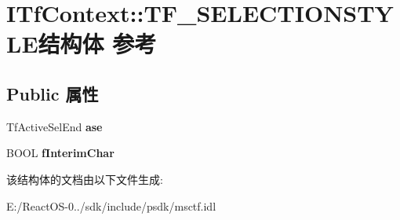 \hypertarget{struct_i_tf_context_1_1_t_f___s_e_l_e_c_t_i_o_n_s_t_y_l_e}{}\section{I\+Tf\+Context\+:\+:T\+F\+\_\+\+S\+E\+L\+E\+C\+T\+I\+O\+N\+S\+T\+Y\+L\+E结构体 参考}
\label{struct_i_tf_context_1_1_t_f___s_e_l_e_c_t_i_o_n_s_t_y_l_e}
\subsection*{Public 属性}
\begin{DoxyCompactItemize}
\item 
\mbox{\label{struct_i_tf_context_1_1_t_f___s_e_l_e_c_t_i_o_n_s_t_y_l_e_abc65c7dfffb71014ba02632d25262c3c}} 
Tf\+Active\+Sel\+End {\bfseries ase}
\item 
\mbox{\label{struct_i_tf_context_1_1_t_f___s_e_l_e_c_t_i_o_n_s_t_y_l_e_a7b9bda27e6a26d63e0e5d8d3d9b4e6a2}} 
B\+O\+OL {\bfseries f\+Interim\+Char}
\end{DoxyCompactItemize}


该结构体的文档由以下文件生成\+:\begin{DoxyCompactItemize}
\item 
E\+:/\+React\+O\+S-\/0../sdk/include/psdk/msctf.\+idl\end{DoxyCompactItemize}
